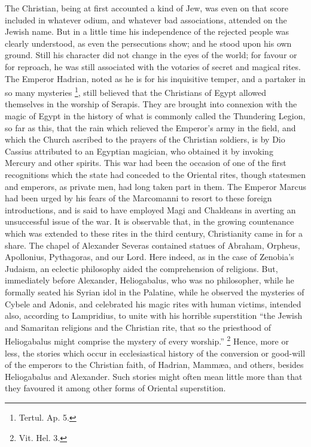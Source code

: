The Christian, being at first accounted a kind of Jew,
was even on that score included in whatever odium, and
whatever bad associations, attended on the Jewish name.
But in a little time his independence of the rejected
people was clearly understood, as even the persecutions
show; and he stood upon his own ground. Still his
character did not change in the eyes of the world; for
favour or for reproach, he was still associated with the
votaries of secret and magical rites. The Emperor
Hadrian, noted as he is for his inquisitive temper, and a
partaker in so many mysteries \footnote{Tertul. Ap. 5.}, still believed that the
Christians of Egypt allowed themselves in the worship of
Serapis. They are brought into connexion with the magic
of Egypt in the history of what is commonly called the
Thundering Legion, so far as this, that the rain which
relieved the Emperor's army in the field, and which the
Church ascribed to the prayers of the Christian soldiers,
is by Dio Cassius attributed to an Egyptian magician, who
obtained it by invoking Mercury and other spirits. This
war had been the occasion of one of the first
recognitions which the state had conceded to the Oriental
rites, though statesmen and emperors, as private men, had
long taken part in them. The Emperor Marcus had been
urged by his fears of the Marcomanni to resort to these
foreign introductions, and is said to have employed Magi
and Chaldeans in averting an unsuccessful issue of the
war. It is observable that, in the growing countenance
which was extended to these rites in the third century,
Christianity came in for a share. The chapel of Alexander
Severas contained statues of Abraham, Orpheus,
Apollonius, Pythagoras, and our Lord. Here indeed, as in
the case of Zenobia's Judaism, an eclectic philosophy
aided the comprehension of religions. But, immediately
before Alexander, Heliogabalus, who was no philosopher,
while he formally seated his Syrian idol in the Palatine,
while he observed the mysteries of Cybele and Adonis, and
celebrated his magic rites with human victims, intended
also, according to Lampridius, to unite with his horrible
superstition ``the Jewish and Samaritan religions and
the Christian rite, that so the priesthood of
Heliogabalus might comprise the mystery of every
worship.'' \footnote{Vit. Hel. 3.} Hence, more or less, the stories which occur in
ecclesiastical history of the conversion or good-will of
the emperors to the Christian faith, of Hadrian, Mammæa,
and others, besides Heliogabalus and Alexander. Such
stories might often mean little more than that they
favoured it among other forms of Oriental superstition.

